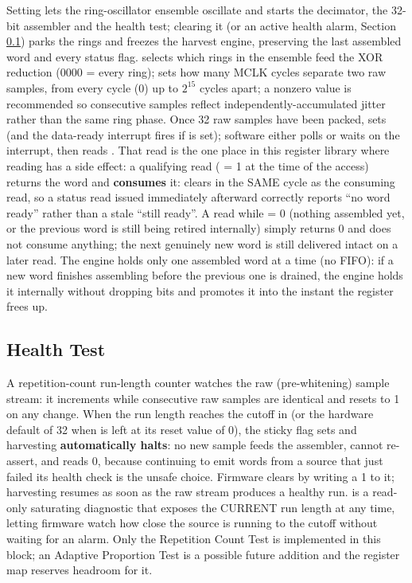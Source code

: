 Setting  lets the ring-oscillator ensemble oscillate and starts the decimator, the 32-bit assembler and the health test; clearing it (or an active health alarm, Section \ref{s:trngx-health}) parks the rings and freezes the harvest engine, preserving the last assembled word and every status flag.  selects which rings in the ensemble feed the XOR reduction (0000 = every ring);  sets how many MCLK cycles separate two raw samples, from every cycle (0) up to $2^{15}$ cycles apart; a nonzero value is recommended so consecutive samples reflect independently-accumulated jitter rather than the same ring phase. Once 32 raw samples have been packed,  sets (and the data-ready interrupt fires if  is set); software either polls  or waits on the interrupt, then reads . That read is the one place in this register library where reading has a side effect: a qualifying read ( = 1 at the time of the access) returns the word and \textbf{consumes} it:  clears in the SAME cycle as the consuming read, so a status read issued immediately afterward correctly reports ``no word ready'' rather than a stale ``still ready''. A read while  = 0 (nothing assembled yet, or the previous word is still being retired internally) simply returns 0 and does not consume anything; the next genuinely new word is still delivered intact on a later read. The engine holds only one assembled word at a time (no FIFO): if a new word finishes assembling before the previous one is drained, the engine holds it internally without dropping bits and promotes it into  the instant the register frees up.

\subsection{Health Test}
\label{s:trngx-health}

A repetition-count run-length counter watches the raw (pre-whitening) sample stream: it increments while consecutive raw samples are identical and resets to 1 on any change. When the run length reaches the cutoff in  (or the hardware default of 32 when  is left at its reset value of 0), the sticky  flag sets and harvesting \textbf{automatically halts}: no new sample feeds the assembler,  cannot re-assert, and  reads 0, because continuing to emit words from a source that just failed its health check is the unsafe choice. Firmware clears  by writing a 1 to it; harvesting resumes as soon as the raw stream produces a healthy run.  is a read-only saturating diagnostic that exposes the CURRENT run length at any time, letting firmware watch how close the source is running to the cutoff without waiting for an alarm. Only the Repetition Count Test is implemented in this block; an Adaptive Proportion Test is a possible future addition and the register map reserves headroom for it.

